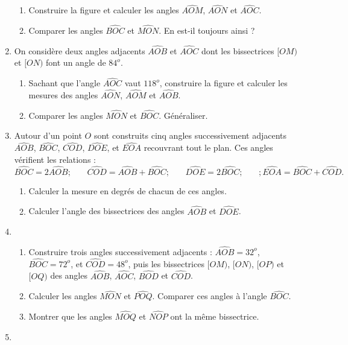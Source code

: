 \documentclass[12 pt]{report}
\theoremstyle{plain}
\newcounter{n}
\begin{document}
\begin{enumerate}
\begin{enumerate}
\item Construire la figure et calculer les angles $\widehat{AOM}$, $\widehat{AON}$ et $\widehat{AOC}$.
\item Comparer les angles $\widehat{BOC}$ et $\widehat{MON}$. En est-il toujours ainsi ? 
\end{enumerate}
\item On considère deux angles adjacents $\widehat{AOB}$ et $\widehat{AOC}$ dont les bissectrices $[OM)$ et $[ON)$ font un angle de $84^o$. \begin{enumerate}
\item Sachant que l'angle $\widehat{AOC}$ vaut $118^o$, construire la figure et calculer les mesures des angles $\widehat{AON}$, $\widehat{AOM}$ et $\widehat{AOB}$. 
\item Comparer les angles $\widehat{MON}$ et $\widehat{BOC}$. Généraliser.
\end{enumerate}
\item Autour d'un point $O$ sont construits cinq angles successivement adjacents $\widehat{AOB}$, $\widehat{BOC}$, $\widehat{COD}$, $\widehat{DOE}$, et $\widehat{EOA}$ recouvrant tout le plan. Ces angles
vérifient les relations : 
\[ \widehat{BOC}= 2\widehat{AOB}; \phantom{meo} \widehat{COD}= \widehat{AOB}+ \widehat{BOC}; \phantom{meo} \widehat{DOE}= 2\widehat{BOC}; \phantom{meo}; \widehat{EOA}= \widehat{BOC}+\widehat{COD}.\]
\begin{enumerate}
\item Calculer la mesure en degrés de chacun de ces angles. 
\item Calculer l'angle des bissectrices des angles $\widehat{AOB}$ et $\widehat{DOE}$. 
\end{enumerate}
\item\begin{enumerate}
\item Construire trois angles successivement adjacents : $\widehat{AOB}= 32^o$, $\widehat{BOC}= 72^o$, et $\widehat{COD}= 48^o$, puis les bissectrices $[OM)$, $[ON)$, $[OP)$ et $[OQ)$ des angles $\widehat{AOB}$, $\widehat{AOC}$, $\widehat{BOD}$ et $\widehat{COD}$. 
\item Calculer les angles $\widehat{MON}$ et $\widehat{POQ}$. Comparer
ces angles à l'angle $\widehat{BOC}$. 
\item Montrer que les angles $\widehat{MOQ}$ et $\widehat{NOP}$ ont la même bissectrice. 
\end{enumerate}
\item \begin{enumerate}

\end{enumerate}
\end{enumerate}
\end{document}
